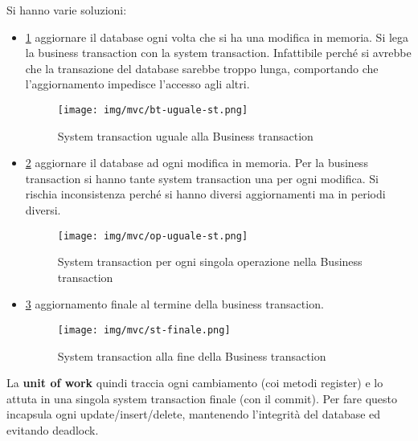 Si hanno varie soluzioni:
\begin{itemize}
      \item \ref{fig:bt-uguale-st} aggiornare il database ogni volta che si ha
            una modifica in memoria. Si lega la business transaction con la
            system transaction. Infattibile perché si avrebbe che la transazione
            del database sarebbe troppo lunga, comportando che l'aggiornamento
            impedisce l'accesso agli altri.
            \begin{figure}[!ht]
                  \centering
                  \texttt{[image: img/mvc/bt-uguale-st.png]}
                  \caption{System transaction uguale alla Business transaction}
                  \label{fig:bt-uguale-st}
            \end{figure}
      \item \ref{fig:op-uguale-st} aggiornare il database ad ogni modifica in
            memoria. Per la business transaction si hanno tante system transaction
            una per ogni modifica. Si rischia inconsistenza perché si hanno
            diversi aggiornamenti ma in periodi diversi.
            \begin{figure}[!ht]
                  \centering
                  \texttt{[image: img/mvc/op-uguale-st.png]}
                  \caption{System transaction per ogni singola operazione nella
                        Business transaction}
                  \label{fig:op-uguale-st}
            \end{figure}
      \item \ref{fig:bt-uguale-st1} aggiornamento finale al termine della business
            transaction.
            \begin{figure}[!ht]
                  \centering
                  \texttt{[image: img/mvc/st-finale.png]}
                  \caption{System transaction alla fine della Business transaction}
                  \label{fig:bt-uguale-st1}
            \end{figure}
\end{itemize}
La \textbf{unit of work} quindi traccia ogni cambiamento (coi metodi register) e
lo attuta in una singola system transaction finale (con il commit). Per fare
questo incapsula ogni update/insert/delete, mantenendo l'integrità del database
ed evitando deadlock.


